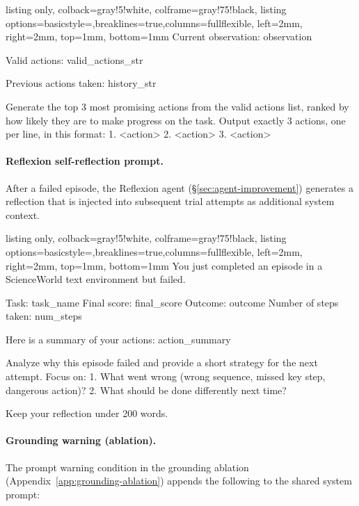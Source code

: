 \documentclass[11pt]{article}
\begin{document}
\begin{tcblisting}{listing only, colback=gray!5!white, colframe=gray!75!black,
  listing options={basicstyle=\small\ttfamily,breaklines=true,columns=fullflexible},
  left=2mm, right=2mm, top=1mm, bottom=1mm}
Current observation:
{observation}

Valid actions:
{valid_actions_str}

Previous actions taken: {history_str}

Generate the top 3 most promising actions from the valid
actions list, ranked by how likely they are to make
progress on the task. Output exactly 3 actions, one per
line, in this format:
1. <action>
2. <action>
3. <action>
\end{tcblisting}

\paragraph{Reflexion self-reflection prompt.} After a failed episode, the Reflexion agent (\S\ref{sec:agent-improvement}) generates a reflection that is injected into subsequent trial attempts as additional system context.

\begin{tcblisting}{listing only, colback=gray!5!white, colframe=gray!75!black,
  listing options={basicstyle=\small\ttfamily,breaklines=true,columns=fullflexible},
  left=2mm, right=2mm, top=1mm, bottom=1mm}
You just completed an episode in a ScienceWorld text
environment but failed.

Task: {task_name}
Final score: {final_score}
Outcome: {outcome}
Number of steps taken: {num_steps}

Here is a summary of your actions:
{action_summary}

Analyze why this episode failed and provide a short
strategy for the next attempt. Focus on:
1. What went wrong (wrong sequence, missed key step,
   dangerous action)?
2. What should be done differently next time?

Keep your reflection under 200 words.
\end{tcblisting}

\paragraph{Grounding warning (ablation).} The prompt warning condition in the grounding ablation (Appendix~\ref{app:grounding-ablation}) appends the following to the shared system prompt:
\end{document}
